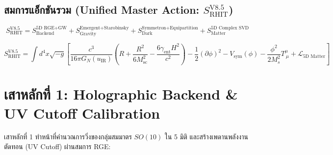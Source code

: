 \documentclass[11pt, a4paper]{article}
\begin{document}
\subsection{สมการแอ็กชันรวม (Unified Master Action: $S_{\text{RHIT}}^{\text{V8.5}}$)}

\begin{equation}
S_{\text{RHIT}}^{\text{V8.5}} = S_{\text{Backend}}^{\text{5D RGE+GW}} + S_{\text{Gravity}}^{\text{Emergent+Starobinsky}} + S_{\text{Dark}}^{\text{Symmetron+Equipartition}} + S_{\text{Matter}}^{\text{5D Complex SVD}}
\end{equation}

\begin{equation}
S_{\text{RHIT}}^{\text{V8.5}} = \int d^4x \sqrt{-g} \left[ \frac{c^3}{16\pi G_N(u_{\text{IR}})} \left( R + \frac{R^2}{6 M_{\text{sc}}^2} - \frac{6\gamma_{\text{ent}} H^2}{c^2} \right) - \frac{1}{2}(\partial\phi)^2 - V_{\text{sym}}(\phi) - \frac{\phi^2}{2M_s^2} T^\mu_{\ \mu} + \mathcal{L}_{5\text{D Matter}} \right]
\end{equation}

\section{เสาหลักที่ 1: Holographic Backend \& UV Cutoff Calibration}

เสาหลักที่ 1 ทำหน้าที่คำนวณการวิ่งของกลุ่มสมมาตร $SO(10)$ ใน 5 มิติ และสร้างเพดานพลังงานตัดทอน (UV Cutoff) ผ่านสมการ RGE:
\end{document}
